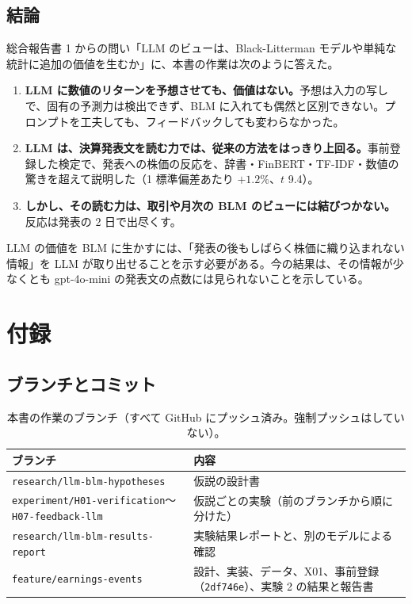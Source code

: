 \documentclass[xelatex,ja=standard,jafont=haranoaji,a4paper,10pt]{bxjsreport}
\newcommand{\code}[1]{\texttt{#1}}
\begin{document}
\chapter{結論}\label{ch:conclusion}

総合報告書 1 からの問い「LLM のビューは、Black-Litterman モデルや単純な統計に追加の価値を生むか」に、本書の作業は次のように答えた。

\begin{enumerate}
\item \textbf{LLM に数値のリターンを予想させても、価値はない。}予想は入力の写しで、固有の予測力は検出できず、BLM に入れても偶然と区別できない。プロンプトを工夫しても、フィードバックしても変わらなかった。
\item \textbf{LLM は、決算発表文を読む力では、従来の方法をはっきり上回る。}事前登録した検定で、発表への株価の反応を、辞書・FinBERT・TF-IDF・数値の驚きを超えて説明した（1 標準偏差あたり $+1.2\%$、$t$ 9.4）。
\item \textbf{しかし、その読む力は、取引や月次の BLM のビューには結びつかない。}反応は発表の 2 日で出尽くす。
\end{enumerate}

LLM の価値を BLM に生かすには、「発表の後もしばらく株価に織り込まれない情報」を LLM が取り出せることを示す必要がある。今の結果は、その情報が少なくとも gpt-4o-mini の発表文の点数には見られないことを示している。

\part{付録}

\appendix

\chapter{ブランチとコミット}\label{app:git}

\begin{table}[H]
\centering
\caption{本書の作業のブランチ（すべて GitHub にプッシュ済み。強制プッシュはしていない）。}
\small
\begin{tabular}{p{5.6cm}p{8.4cm}}
\toprule
ブランチ & 内容 \\
\midrule
\code{research/llm-blm-hypotheses} & 仮説の設計書 \\
\code{experiment/H01-verification}〜\code{H07-feedback-llm} & 仮説ごとの実験（前のブランチから順に分けた） \\
\code{research/llm-blm-results-report} & 実験結果レポートと、別のモデルによる確認 \\
\code{feature/earnings-events} & 設計、実装、データ、X01、事前登録（\code{2df746e}）、実験 2 の結果と報告書 \\
\bottomrule
\end{tabular}
\end{table}
\end{document}
